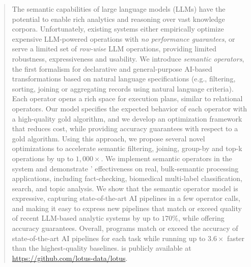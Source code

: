 \begin{abstract}
The semantic capabilities of large language models (LLMs) have the potential to enable rich analytics and reasoning over vast knowledge corpora. 
Unfortunately, existing systems either empirically optimize expensive LLM-powered operations with \emph{no performance guarantees}, or serve a limited set of \emph{row-wise} LLM operations, providing limited robustness, expressiveness and usability.
We introduce \emph{semantic operators}, the first formalism for declarative and general-purpose AI-based transformations based on natural language specifications (e.g., filtering, sorting, joining or aggregating records using natural language criteria).  Each operator opens a rich space for execution plans, similar to relational operators. Our model specifies the expected behavior of each operator with a high-quality gold algorithm, and we develop an optimization framework that reduces cost, while providing accuracy guarantees with respect to a gold algorithm.
Using this approach, we propose several novel optimizations to accelerate semantic filtering, joining, group-by and top-k operations by up to $1,000\times$.  We implement semantic operators in the \sys system and demonstrate \sys' effectiveness on real, bulk-semantic processing applications, including fact-checking, biomedical multi-label classification, search, and topic analysis. We show that the semantic operator model is expressive, capturing state-of-the-art AI pipelines in a few operator calls, and making it easy to express new pipelines that match or exceed quality of recent LLM-based analytic systems by up to $170\%$, while offering accuracy guarantees.
Overall, \sys programs match or exceed the accuracy of state-of-the-art AI pipelines for each task while running up to $3.6\times$ faster than the highest-quality baselines. 
    \sys is publicly available at \url{https://github.com/lotus-data/lotus}.
\end{abstract}